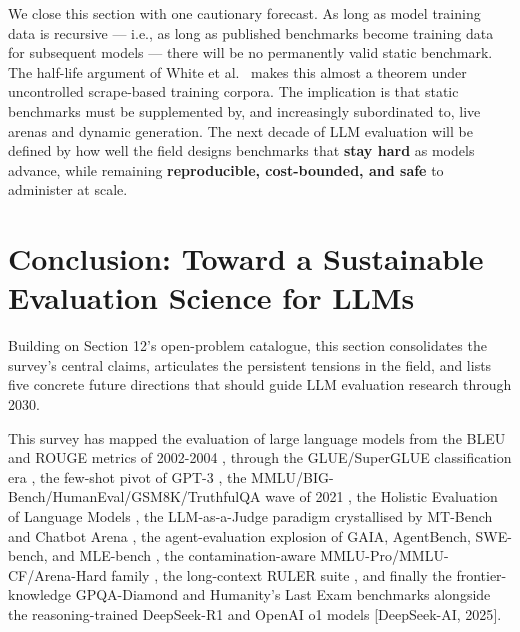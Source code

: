 \documentclass{article}
\begin{document}
We close this section with one cautionary forecast. As long as model training data is recursive --- i.e., as long as published benchmarks become training data for subsequent models --- there will be no permanently valid static benchmark. The half-life argument of White et al.~\cite{white20242024} makes this almost a theorem under uncontrolled scrape-based training corpora. The implication is that static benchmarks must be supplemented by, and increasingly subordinated to, live arenas and dynamic generation. The next decade of LLM evaluation will be defined by how well the field designs benchmarks that \textbf{stay hard} as models advance, while remaining \textbf{reproducible, cost-bounded, and safe} to administer at scale.

\section{Conclusion: Toward a Sustainable Evaluation Science for LLMs}\label{conclusion-toward-a-sustainable-evaluation-science-for-llms}

Building on Section 12's open-problem catalogue, this section consolidates the survey's central claims, articulates the persistent tensions in the field, and lists five concrete future directions that should guide LLM evaluation research through 2030.

This survey has mapped the evaluation of large language models from the BLEU and ROUGE metrics of 2002-2004 \cite{papineni2002bleuamethodforauto,lin2004rougeapackageforau}, through the GLUE/SuperGLUE classification era \cite{wang2018glueamultitaskbenc,wang2019superglueastickier}, the few-shot pivot of GPT-3 \cite{brown20202020}, the MMLU/BIG-Bench/HumanEval/GSM8K/TruthfulQA wave of 2021 \cite{hendrycks2021measuringmassivemu,chen20212021,cobbe20212021,lin2022truthfulqameasurin}, the Holistic Evaluation of Language Models \cite{liang20222022,bommasani2023holisticevaluation}, the LLM-as-a-Judge paradigm crystallised by MT-Bench and Chatbot Arena \cite{zheng20232023,chiang20242024}, the agent-evaluation explosion of GAIA, AgentBench, SWE-bench, and MLE-bench \cite{mialon2024gaiaabenchmarkforg,liu2023gevalnlgevaluation,jimenez20242024,chan20242024}, the contamination-aware MMLU-Pro/MMLU-CF/Arena-Hard family \cite{wang20242024,zhao20242024,li20242024}, the long-context RULER suite \cite{hsieh20242024}, and finally the frontier-knowledge GPQA-Diamond and Humanity's Last Exam benchmarks \cite{rein2024gpqaagraduatelevel,phan20252025} alongside the reasoning-trained DeepSeek-R1 and OpenAI o1 models {[}DeepSeek-AI, 2025{]}.
\end{document}
